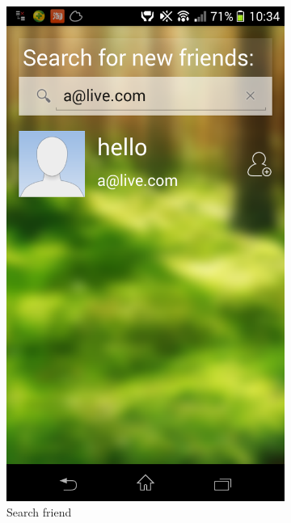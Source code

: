 \begin{figure}
\begin{subfigure}{.24\textwidth}
  \includegraphics[width=.8\linewidth]{img/screenshot/ss3.png}
  \caption{Search friend}
\end{subfigure}
\begin{subfigure}{.24\textwidth}
  \centering

\end{subfigure}
\end{figure}
